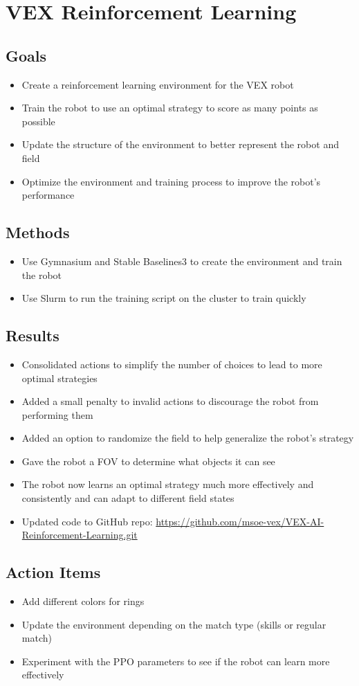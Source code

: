 \section{VEX Reinforcement Learning}

\subsection{Goals}
\begin{itemize}
    \item Create a reinforcement learning environment for the VEX robot
    \item Train the robot to use an optimal strategy to score as many points as possible
    \item Update the structure of the environment to better represent the robot and field
    \item Optimize the environment and training process to improve the robot's performance
\end{itemize}

\subsection{Methods}
\begin{itemize}
    \item Use Gymnasium and Stable Baselines3 to create the environment and train the robot
    \item Use Slurm to run the training script on the cluster to train quickly
\end{itemize}

\subsection{Results}
\begin{itemize}
    \item Consolidated actions to simplify the number of choices to lead to more optimal strategies
    \item Added a small penalty to invalid actions to discourage the robot from performing them
    \item Added an option to randomize the field to help generalize the robot's strategy
    \item Gave the robot a FOV to determine what objects it can see
    \item The robot now learns an optimal strategy much more effectively and consistently and can adapt to different field states
    \item Updated code to GitHub repo: \href{https://github.com/msoe-vex/VEX-AI-Reinforcement-Learning.git}{https://github.com/msoe-vex/VEX-AI-Reinforcement-Learning.git}
\end{itemize}

\subsection{Action Items}
\begin{itemize}
    \item Add different colors for rings
    \item Update the environment depending on the match type (skills or regular match)
    \item Experiment with the PPO parameters to see if the robot can learn more effectively
\end{itemize}
